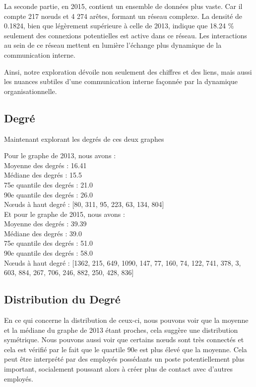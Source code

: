 \documentclass{article}
\begin{document}
La seconde partie, en 2015, contient un ensemble de données plus vaste. Car il compte 217 nœuds et 4 274 arêtes, formant un réseau complexe. La densité de 0.1824, bien que légèrement supérieure à celle de 2013, indique que 18.24 \% seulement des connexions potentielles est active dans ce réseau. Les interactions au sein de ce réseau mettent en lumière l’échange plus dynamique de la communication interne.

Ainsi, notre exploration dévoile non seulement des chiffres et des liens, mais aussi les nuances subtiles d'une communication interne façonnée par la dynamique organisationnelle.

\subsection{Degré}
Maintenant explorant les degrés de ces deux graphes

Pour le graphe de 2013, nous avons : \\
Moyenne des degrés : 16.41 \\
Médiane des degrés : 15.5 \\
75e quantile des degrés : 21.0 \\
90e quantile des degrés : 26.0 \\
Nœuds à haut degré : [80, 311, 95, 223, 63, 134, 804] \\

Et pour le graphe de 2015, nous avons :  \\
Moyenne des degrés : 39.39 \\
Médiane des degrés : 39.0 \\
75e quantile des degrés : 51.0 \\
90e quantile des degrés : 58.0 \\
Nœuds à haut degré : [1362, 215, 649, 1090, 147, 77, 160, 74, 122, 741, 378, 3, 603, 884, 267, 706, 246, 882, 250, 428, 836] \\

\subsection{Distribution du Degré}
En ce qui concerne la distribution de ceux-ci, nous pouvons voir que la moyenne et la médiane du graphe de 2013 étant proches, cela suggère une distribution symétrique.
Nous pouvons aussi voir que certains nœuds sont très connectés et cela est vérifié par le fait que le quartile 90e est plus élevé que la moyenne. Cela peut être interprété par des employés possédants un poste potentiellement plus important, socialement poussant alors à créer plus de contact avec d’autres employés.
\end{document}
